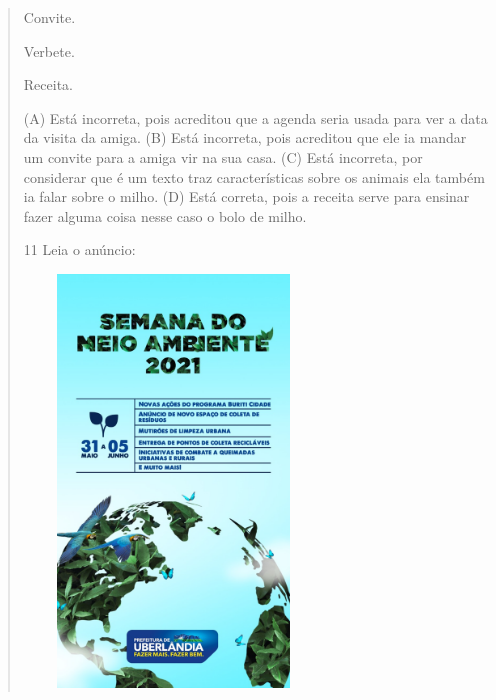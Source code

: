 \begin{verse}
\begin{minipage}{.5\textwidth}
\begin{escolha}
\item Convite.

\item Verbete.

\item Receita.
\end{escolha}
\end{minipage}

(A) Está incorreta, pois acreditou que a agenda seria usada para ver a
data da visita da amiga.
(B) Está incorreta, pois acreditou que ele ia mandar um convite para a
amiga vir na sua casa.
(C) Está incorreta, por considerar que é um texto traz características
sobre os animais ela também ia falar sobre o milho.
(D) Está correta, pois a receita serve para ensinar fazer alguma coisa
nesse caso o bolo de milho.

\num{11} Leia o anúncio:

\includegraphics[width=3.12674in,height=4.31210in]{media/image145.jpeg}



\end{verse}
